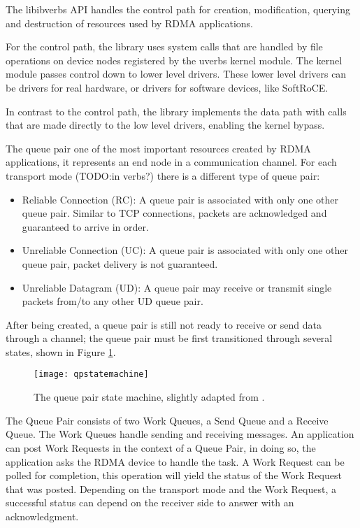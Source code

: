 The libibverbs API handles the control path for creation, modification, querying and destruction of resources used by RDMA applications.

For the control path, the library uses system calls that are handled by file operations on device nodes
registered by the uverbs kernel module. The kernel module passes control down to lower level drivers.
These lower level drivers can be drivers for real hardware, or drivers for software devices, like SoftRoCE.

In contrast to the control path,  the library implements the data path with calls that are made
directly to the low level drivers, enabling the kernel bypass\cite{}.

The queue pair one of the most important resources created by RDMA applications, it represents an end node
in a communication channel. For each transport mode (TODO:in verbs?) there is a different type of queue pair\cite{rdmamanual}:

\begin{itemize}
  \item Reliable Connection (RC): A queue pair is associated with only one other queue pair. Similar to TCP connections, packets are acknowledged and guaranteed to arrive in order.
  \item Unreliable Connection (UC): A queue pair is associated with only one other queue pair, packet delivery is not guaranteed.
  \item Unreliable Datagram (UD): A queue pair may receive or transmit single packets from/to any other UD queue pair.
\end{itemize}

After being created, a queue pair is still not ready to receive or send data through a channel; the queue pair must be first
transitioned through several states, shown in Figure \ref{fig:qpstatemachine}.

\begin{figure}[h!]
  \centering
  \texttt{[image: qpstatemachine]}
  \caption[Queue pair state machine]{The queue pair state machine, slightly adapted from \cite{QPStateMachine2012}.}
  \label{fig:qpstatemachine}
\end{figure}


The Queue Pair consists of two Work Queues, a Send Queue and a Receive
Queue. The Work Queues handle sending and receiving messages.
An application can post Work Requests in the context of a Queue Pair, in
doing so, the application asks the RDMA device to handle the task.
A Work Request can be polled for completion, this operation will yield
the status of the Work Request that was posted. Depending on the transport
mode and the Work Request, a successful status can depend on the receiver
side to answer with an acknowledgment.


